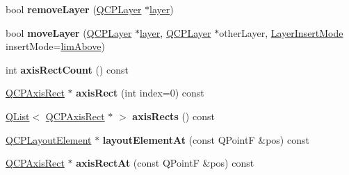 \begin{DoxyCompactItemize}
\item 
\mbox{\label{class_q_custom_plot_a40f75e342c5eaab6a86066a42a0e2a94}} 
bool {\bfseries remove\+Layer} (\hyperlink{class_q_c_p_layer}{Q\+C\+P\+Layer} $\ast$\hyperlink{class_q_custom_plot_a0a96244e7773b242ef23c32b7bdfb159}{layer})
\item 
\mbox{\label{class_q_custom_plot_ae896140beff19424e9e9e02d6e331104}} 
bool {\bfseries move\+Layer} (\hyperlink{class_q_c_p_layer}{Q\+C\+P\+Layer} $\ast$\hyperlink{class_q_custom_plot_a0a96244e7773b242ef23c32b7bdfb159}{layer}, \hyperlink{class_q_c_p_layer}{Q\+C\+P\+Layer} $\ast$other\+Layer, \hyperlink{class_q_custom_plot_a75a8afbe6ef333b1f3d47abb25b9add7}{Layer\+Insert\+Mode} insert\+Mode=\hyperlink{class_q_custom_plot_a75a8afbe6ef333b1f3d47abb25b9add7a56ffb40bbf81e9b5d869cffc88999a36}{lim\+Above})
\item 
\mbox{\label{class_q_custom_plot_a8f85940aaac50efb466287d9d2d04ec6}} 
int {\bfseries axis\+Rect\+Count} () const
\item 
\mbox{\label{class_q_custom_plot_af2e2bae546fb3c0049cefabef404219c}} 
\hyperlink{class_q_c_p_axis_rect}{Q\+C\+P\+Axis\+Rect} $\ast$ {\bfseries axis\+Rect} (int index=0) const
\item 
\mbox{\label{class_q_custom_plot_ad8720aa7d48208225b47c55ddd4f1b33}} 
\hyperlink{class_q_list}{Q\+List}$<$ \hyperlink{class_q_c_p_axis_rect}{Q\+C\+P\+Axis\+Rect} $\ast$ $>$ {\bfseries axis\+Rects} () const
\item 
\mbox{\label{class_q_custom_plot_ab4f5265432cc404661f5b526c34b3677}} 
\hyperlink{class_q_c_p_layout_element}{Q\+C\+P\+Layout\+Element} $\ast$ {\bfseries layout\+Element\+At} (const Q\+PointF \&pos) const
\item 
\mbox{\label{class_q_custom_plot_a67a5317c146bf594ed578ab9eeebf73f}} 
\hyperlink{class_q_c_p_axis_rect}{Q\+C\+P\+Axis\+Rect} $\ast$ {\bfseries axis\+Rect\+At} (const Q\+PointF \&pos) const
\item 
\mbox{\label{class_q_custom_plot_a8898682337c33b27b42b85218a8d4c0b}} 

\end{DoxyCompactItemize}
